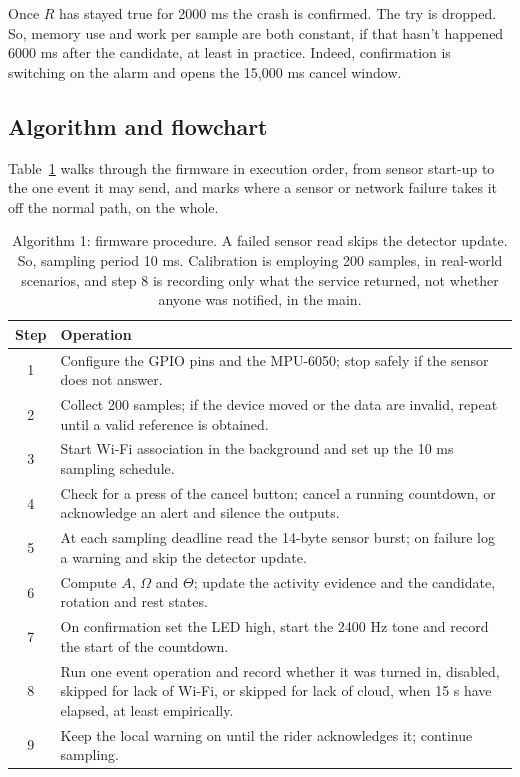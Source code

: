 \documentclass[10pt,a4paper]{article}
\begin{document}
Once $R$ has stayed true for 2000 ms the crash is confirmed. The try is dropped. So, memory use and work per sample are both constant, if that hasn't happened 6000 ms after the candidate, at least in practice. Indeed, confirmation is switching on the alarm and opens the 15,000 ms cancel window.

\subsection{Algorithm and flowchart}
Table~\ref{tab:algo} walks through the firmware in execution order, from sensor start-up to the one event it may send, and marks where a sensor or network failure takes it off the normal path, on the whole.

\begin{table}[H]\centering\small\caption{Algorithm 1: firmware procedure. A failed sensor read skips the detector update. So, sampling period 10 ms. Calibration is employing 200 samples, in real-world scenarios, and step 8 is recording only what the service returned, not whether anyone was notified, in the main.}\label{tab:algo}
\begin{tabularx}{\linewidth}{|c|X|}\hline
\textbf{Step} & \textbf{Operation}\\\hline
1 & Configure the GPIO pins and the MPU-6050; stop safely if the sensor does not answer.\\\hline
2 & Collect 200 samples; if the device moved or the data are invalid, repeat until a valid reference is obtained.\\\hline
3 & Start Wi-Fi association in the background and set up the 10 ms sampling schedule.\\\hline
4 & Check for a press of the cancel button; cancel a running countdown, or acknowledge an alert and silence the outputs.\\\hline
5 & At each sampling deadline read the 14-byte sensor burst; on failure log a warning and skip the detector update.\\\hline
6 & Compute $A$, $\Omega$ and $\Theta$; update the activity evidence and the candidate, rotation and rest states.\\\hline
7 & On confirmation set the LED high, start the 2400 Hz tone and record the start of the countdown.\\\hline
8 & Run one event operation and record whether it was turned in, disabled, skipped for lack of Wi-Fi, or skipped for lack of cloud, when 15 s have elapsed, at least empirically.\\\hline
9 & Keep the local warning on until the rider acknowledges it; continue sampling.\\\hline
\end{tabularx}\end{table}
\end{document}
